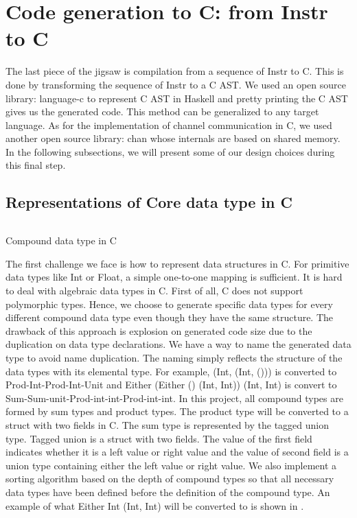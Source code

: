 \section{Code generation to C: from Instr to C}
The last piece of the jigsaw is compilation from a sequence of Instr to C. This is done by transforming the sequence of Instr to a C AST. We used an open source library: language-c \cite{LanguagecAnalysisGeneration} to represent C AST in Haskell and pretty printing the C AST gives us the generated code. This method can be generalized to any target language. As for the implementation of channel communication in C, we used another open source library: chan \cite{treatPureImplementationGo2019} whose internals are based on shared memory. In the following subsections, we will present some of our design choices during this final step.
\subsection{Representations of Core data type in C}
\begin{listing}[ht]
    \inputminted{C}{codegen/data.c} 
    \caption{Compound data type in C}
    \label{codegen:code:data}
\end{listing}
The first challenge we face is how to represent data structures in C. For primitive data types like Int or Float, a simple one-to-one mapping is sufficient. It is hard to deal with algebraic data types in C. First of all, C does not support polymorphic types. Hence, we choose to generate specific data types for every different compound data type even though they have the same structure. The drawback of this approach is explosion on generated code size due to the duplication on data type declarations. We have a way to name the generated data type to avoid name duplication. The naming simply reflects the structure of the data types with its elemental type. For example, (Int, (Int, ())) is converted to Prod-Int-Prod-Int-Unit and Either (Either () (Int, Int)) (Int, Int) is convert to Sum-Sum-unit-Prod-int-int-Prod-int-int. In this project, all compound types are formed by sum types and product types. The product type will be converted to a struct with two fields in C. The sum type is represented by the tagged union type. Tagged union is a struct with two fields. The value of the first field indicates whether it is a left value or right value and the value of second field is a union type containing either the left value or right value. We also implement a sorting algorithm based on the depth of compound types so that all necessary data types have been defined before the definition of the compound type. An example of what Either Int (Int, Int) will be converted to is shown in .

